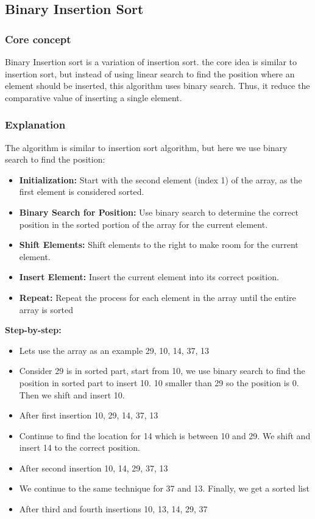 \subsection{Binary Insertion Sort}

\subsubsection{Core concept}
Binary Insertion sort is a variation of insertion sort. the core idea is similar to insertion sort, but instead of using linear search to find the position where an element should be inserted, this algorithm uses binary search. Thus, it reduce the comparative value of inserting a single element. ~\cite{ref8}

\subsubsection{Explanation}
The algorithm is similar to insertion sort algorithm, but here we use binary search to find the position:
\begin{itemize}[label=-]
    \item \textbf{Initialization:} Start with the second element (index 1) of the array, as the first element is considered sorted.
    \item \textbf{Binary Search for Position:} Use binary search to determine the correct position in the sorted portion of the array for the current element.
    \item \textbf{Shift Elements:} Shift elements to the right to make room for the current element.
    \item \textbf{Insert Element:} Insert the current element into its correct position.
    \item \textbf{Repeat:} Repeat the process for each element in the array until the entire array is sorted
\end{itemize}

\textbf{Step-by-step:}
\begin{itemize}[label=-]
    \item Lets use the array as an example {29, 10, 14, 37, 13}

    \item Consider 29 is in sorted part, start from 10, we use binary search to find the position in sorted part to insert 10. 10 smaller than 29 so the position is 0. Then we shift and insert 10.

    \item After first insertion {10, 29, 14, 37, 13}

    \item Continue to find the location for 14 which is between 10 and 29. We shift and insert 14 to the correct position.

    \item After second insertion {10, 14, 29, 37, 13}

    \item We continue to the same technique for 37 and 13. Finally, we get a sorted list

    \item After third and fourth insertions {10, 13, 14, 29, 37}
\end{itemize}


